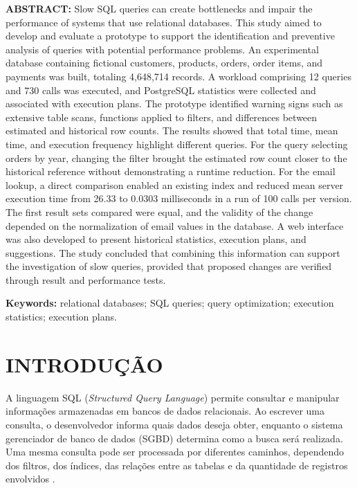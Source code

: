 \documentclass{UNESC}
\begin{document}
\vspace{1em}
\noindent
\textbf{ABSTRACT:}
Slow SQL queries can create bottlenecks and impair the performance of systems that use relational databases. This study aimed to develop and evaluate a prototype to support the identification and preventive analysis of queries with potential performance problems. An experimental database containing fictional customers, products, orders, order items, and payments was built, totaling 4,648,714 records. A workload comprising 12 queries and 730 calls was executed, and PostgreSQL statistics were collected and associated with execution plans. The prototype identified warning signs such as extensive table scans, functions applied to filters, and differences between estimated and historical row counts. The results showed that total time, mean time, and execution frequency highlight different queries. For the query selecting orders by year, changing the filter brought the estimated row count closer to the historical reference without demonstrating a runtime reduction. For the email lookup, a direct comparison enabled an existing index and reduced mean server execution time from 26.33 to 0.0303 milliseconds in a run of 100 calls per version. The first result sets compared were equal, and the validity of the change depended on the normalization of email values in the database. A web interface was also developed to present historical statistics, execution plans, and suggestions. The study concluded that combining this information can support the investigation of slow queries, provided that proposed changes are verified through result and performance tests.

\vspace{0.5em}
\noindent
\textbf{Keywords:}
relational databases; SQL queries; query optimization;
execution statistics; execution plans.



\section{INTRODUÇÃO}

A linguagem SQL (\textit{Structured Query Language}) permite consultar e manipular informações armazenadas em bancos de dados relacionais. Ao escrever uma consulta, o desenvolvedor informa quais dados deseja obter, enquanto o sistema gerenciador de banco de dados (SGBD) determina como a busca será realizada. Uma mesma consulta pode ser processada por diferentes caminhos, dependendo dos filtros, dos índices, das relações entre as tabelas e da quantidade de registros envolvidos \cite{lan2021optimizer}.
\end{document}
